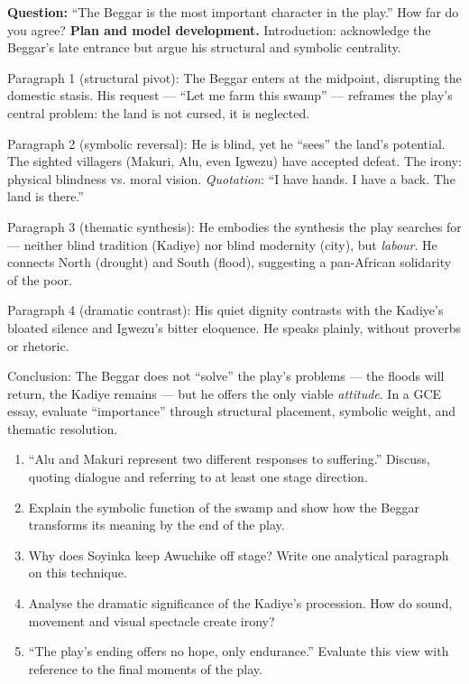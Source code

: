 \documentclass[11pt]{article}
\begin{document}
\begin{exoresolu}
\textbf{Question:} ``The Beggar is the most important character in the play.'' How far do you agree?
\tcblower
\textbf{Plan and model development.} Introduction: acknowledge the Beggar's late entrance but argue his structural and symbolic centrality.

Paragraph 1 (structural pivot): The Beggar enters at the midpoint, disrupting the domestic stasis. His request — ``Let me farm this swamp'' — reframes the play's central problem: the land is not cursed, it is neglected.

Paragraph 2 (symbolic reversal): He is blind, yet he ``sees'' the land's potential. The sighted villagers (Makuri, Alu, even Igwezu) have accepted defeat. The irony: physical blindness vs. moral vision. \emph{Quotation}: ``I have hands. I have a back. The land is there.''

Paragraph 3 (thematic synthesis): He embodies the synthesis the play searches for — neither blind tradition (Kadiye) nor blind modernity (city), but \emph{labour}. He connects North (drought) and South (flood), suggesting a pan-African solidarity of the poor.

Paragraph 4 (dramatic contrast): His quiet dignity contrasts with the Kadiye's bloated silence and Igwezu's bitter eloquence. He speaks plainly, without proverbs or rhetoric.

Conclusion: The Beggar does not ``solve'' the play's problems — the floods will return, the Kadiye remains — but he offers the only viable \emph{attitude}. In a GCE essay, evaluate ``importance'' through structural placement, symbolic weight, and thematic resolution.
\end{exoresolu}

\begin{exercice}
\begin{enumerate}
\item ``Alu and Makuri represent two different responses to suffering.'' Discuss, quoting dialogue and referring to at least one stage direction.
\item Explain the symbolic function of the swamp and show how the Beggar transforms its meaning by the end of the play.
\item Why does Soyinka keep Awuchike off stage? Write one analytical paragraph on this technique.
\item Analyse the dramatic significance of the Kadiye's procession. How do sound, movement and visual spectacle create irony?
\item ``The play's ending offers no hope, only endurance.'' Evaluate this view with reference to the final moments of the play.
\end{enumerate}
\end{exercice}
\end{document}
